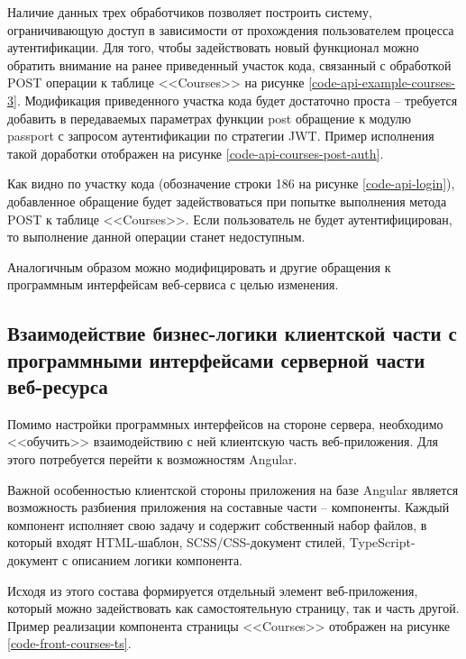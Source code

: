 Наличие данных трех обработчиков позволяет построить систему, ограничивающую доступ в зависимости от прохождения пользователем процесса аутентификации.
Для того, чтобы задействовать новый функционал можно обратить внимание на ранее приведенный участок кода, связанный с обработкой POST операции к таблице <<Courses>> на рисунке \ref{code-api-example-courses-3}.
Модификация приведенного участка кода будет достаточно проста -- требуется добавить в передаваемых параметрах функции post обращение к модулю passport с запросом аутентификации по стратегии JWT.
Пример исполнения такой доработки отображен на рисунке \ref{code-api-courses-post-auth}.


Как видно по участку кода (обозначение строки 186 на рисунке \ref{code-api-login}), добавленное обращение будет задействоваться при попытке выполнения метода POST к таблице <<Courses>>.
Если пользователь не будет аутентифицирован, то выполнение данной операции станет недоступным.

Аналогичным образом можно модифицировать и другие обращения к программным интерфейсам веб-сервиса с целью изменения.


\subsection{Взаимодействие бизнес-логики клиентской части с программными интерфейсами серверной части веб-ресурса}

Помимо настройки программных интерфейсов на стороне сервера, необходимо <<обучить>> взаимодействию с ней клиентскую часть веб-приложения.
Для этого потребуется перейти к возможностям Angular.

Важной особенностью клиентской стороны приложения на базе Angular является возможность разбиения приложения на составные части -- компоненты.
Каждый компонент исполняет свою задачу и содержит собственный набор файлов, в который входят HTML-шаблон, SCSS/CSS-документ стилей, TypeScript-документ с описанием логики компонента.

Исходя из этого состава формируется отдельный элемент веб-приложения, который можно задействовать как самостоятельную страницу, так и часть другой.
Пример реализации компонента страницы <<Courses>> отображен на рисунке \ref{code-front-courses-ts}.


